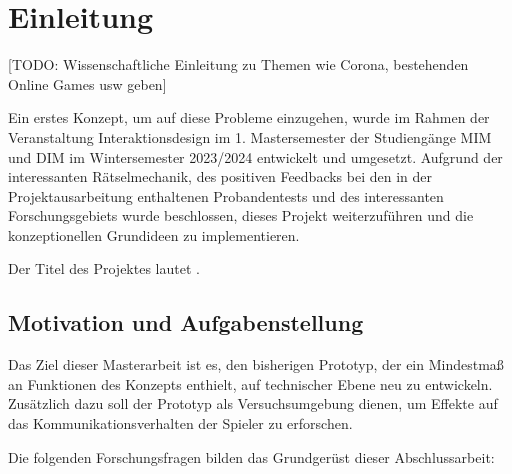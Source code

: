 \chapter{Einleitung}



[TODO: Wissenschaftliche Einleitung zu Themen wie Corona, bestehenden Online Games usw geben]

Ein erstes Konzept, um auf diese Probleme einzugehen, wurde im Rahmen der Veranstaltung Interaktionsdesign im 1. Mastersemester der Studiengänge \ac{MIM} und \ac{DIM} im Wintersemester 2023/2024 entwickelt und umgesetzt. 
Aufgrund der interessanten Rätselmechanik, des positiven Feedbacks bei den in der Projektausarbeitung enthaltenen Probandentests und des interessanten Forschungsgebiets wurde beschlossen, dieses Projekt weiterzuführen und die konzeptionellen Grundideen zu implementieren.

Der Titel des Projektes lautet .

\section{Motivation und Aufgabenstellung}
Das Ziel dieser Masterarbeit ist es, den bisherigen Prototyp, der ein Mindestmaß an Funktionen des Konzepts enthielt, auf technischer Ebene neu zu entwickeln. Zusätzlich dazu soll der Prototyp als Versuchsumgebung dienen, um Effekte auf das Kommunikationsverhalten der Spieler zu erforschen. 

Die folgenden Forschungsfragen bilden das Grundgerüst dieser Abschlussarbeit:



